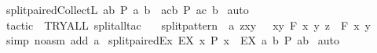 \begin{isabellebody}
%
\isadelimproof
\isanewline
%
\endisadelimproof
\isanewline
{}\isamarkupfalse%
\ split{\isacharunderscore}paired{\isacharunderscore}CollectL{\isacharcolon}\ {\isachardoublequoteopen}{\isacharbraceleft}{\isacharparenleft}a{\isacharcomma}b{\isacharparenright}{\isachardot}\ P\ a\ b{\isacharbraceright}\ {\isacharequal}\ {\isacharbraceleft}{\isacharparenleft}{\isacharparenleft}a{\isacharcomma}c{\isacharparenright}{\isacharcomma}b{\isacharparenright}{\isachardot}\ P\ {\isacharparenleft}a{\isacharcomma}c{\isacharparenright}\ b{\isacharbraceright}{\isachardoublequoteclose}\isanewline
%
\isadelimproof
%
\endisadelimproof
%
\isatagproof
{}\isamarkupfalse%
\ auto\isanewline
{}\isamarkupfalse%
\ {\isacharparenleft}tactic\ {\isacharverbatimopen}\ TRYALL\ split{\isacharunderscore}all{\isacharunderscore}tac\ {\isacharverbatimclose}\ {\isacharparenright}\isanewline
{}\isamarkupfalse%
%
\endisatagproof
{\isafoldproof}%
%
\isadelimproof
\isanewline
%
\endisadelimproof
\isanewline
{}\isamarkupfalse%
\ split{\isacharunderscore}pattern{\isacharcolon}\ \ a{\isacharcolon}\ {\isachardoublequoteopen}z{\isacharequal}{\isacharparenleft}x{\isacharcomma}y{\isacharparenright}{\isachardoublequoteclose}\ \ {\isachardoublequoteopen}{\isacharparenleft}{\isacharpercent}\ {\isacharparenleft}x{\isacharcomma}y{\isacharparenright}{\isachardot}\ F\ x\ y{\isacharparenright}\ z\ {\isacharequal}\ F\ x\ y{\isachardoublequoteclose}\isanewline
%
\isadelimproof
%
\endisadelimproof
%
\isatagproof
{}\isamarkupfalse%
\ {\isacharparenleft}simp\ {\isacharparenleft}no{\isacharunderscore}asm{\isacharparenright}\ add{\isacharcolon}\ a{\isacharparenright}\isanewline
{}\isamarkupfalse%
%
\endisatagproof
{\isafoldproof}%
%
\isadelimproof
\isanewline
%
\endisadelimproof
\isanewline
{}\isamarkupfalse%
\ split{\isacharunderscore}paired{\isacharunderscore}Ex{\isacharcolon}\ {\isachardoublequoteopen}{\isacharparenleft}EX\ x{\isachardot}\ P\ x{\isacharparenright}\ {\isacharequal}\ {\isacharparenleft}EX\ a\ b{\isachardot}\ P\ {\isacharparenleft}a{\isacharcomma}b{\isacharparenright}{\isacharparenright}{\isachardoublequoteclose}\isanewline
%
\isadelimproof
%
\endisadelimproof
%
\isatagproof
{}\isamarkupfalse%
\ auto\isanewline
{}\isamarkupfalse%
%
\endisatagproof
{\isafoldproof}%
%
\isadelimproof
\isanewline
%
\endisadelimproof
%
\isadelimML
\isanewline
%
\endisadelimML
%
\isatagML
{}\isamarkupfalse%
\isanewline
{\isacharverbatimopen}\isanewline

\end{isabellebody}
